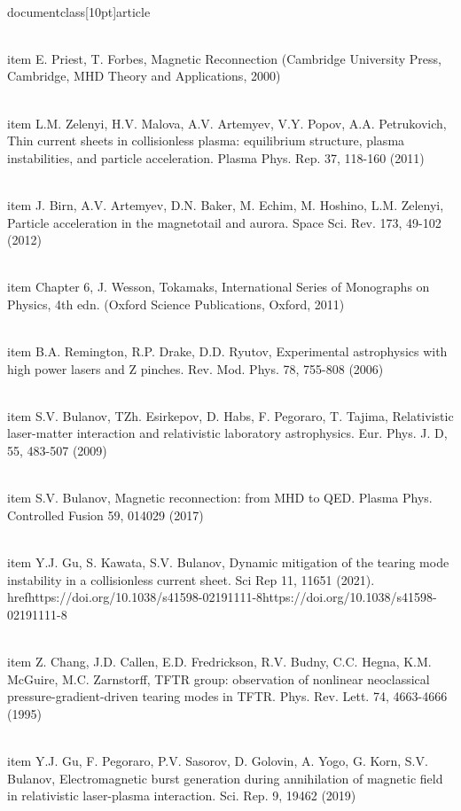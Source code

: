 \\documentclass[10pt]{article}
\begin{document}
{{{{  \\item E. Priest, T. Forbes, Magnetic Reconnection (Cambridge University Press, Cambridge, MHD Theory and Applications, 2000)

  \\item L.M. Zelenyi, H.V. Malova, A.V. Artemyev, V.Y. Popov, A.A. Petrukovich, Thin current sheets in collisionless plasma: equilibrium structure, plasma instabilities, and particle acceleration. Plasma Phys. Rep. 37, 118-160 (2011)

  \\item J. Birn, A.V. Artemyev, D.N. Baker, M. Echim, M. Hoshino, L.M. Zelenyi, Particle acceleration in the magnetotail and aurora. Space Sci. Rev. 173, 49-102 (2012)

  \\item Chapter 6, J. Wesson, Tokamaks, International Series of Monographs on Physics, 4th edn. (Oxford Science Publications, Oxford, 2011)

  \\item B.A. Remington, R.P. Drake, D.D. Ryutov, Experimental astrophysics with high power lasers and Z pinches. Rev. Mod. Phys. 78, 755-808 (2006)

  \\item S.V. Bulanov, TZh. Esirkepov, D. Habs, F. Pegoraro, T. Tajima, Relativistic laser-matter interaction and relativistic laboratory astrophysics. Eur. Phys. J. D, 55, 483-507 (2009)

  \\item S.V. Bulanov, Magnetic reconnection: from MHD to QED. Plasma Phys. Controlled Fusion 59, 014029 (2017)

  \\item Y.J. Gu, S. Kawata, S.V. Bulanov, Dynamic mitigation of the tearing mode instability in a collisionless current sheet. Sci Rep 11, 11651 (2021). \\href{https://doi.org/10.1038/s41598-02191111-8}{https://doi.org/10.1038/s41598-02191111-8}

  \\item Z. Chang, J.D. Callen, E.D. Fredrickson, R.V. Budny, C.C. Hegna, K.M. McGuire, M.C. Zarnstorff, TFTR group: observation of nonlinear neoclassical pressure-gradient-driven tearing modes in TFTR. Phys. Rev. Lett. 74, 4663-4666 (1995)

  \\item Y.J. Gu, F. Pegoraro, P.V. Sasorov, D. Golovin, A. Yogo, G. Korn, S.V. Bulanov, Electromagnetic burst generation during annihilation of magnetic field in relativistic laser-plasma interaction. Sci. Rep. 9, 19462 (2019)

}}}}
\end{document}
